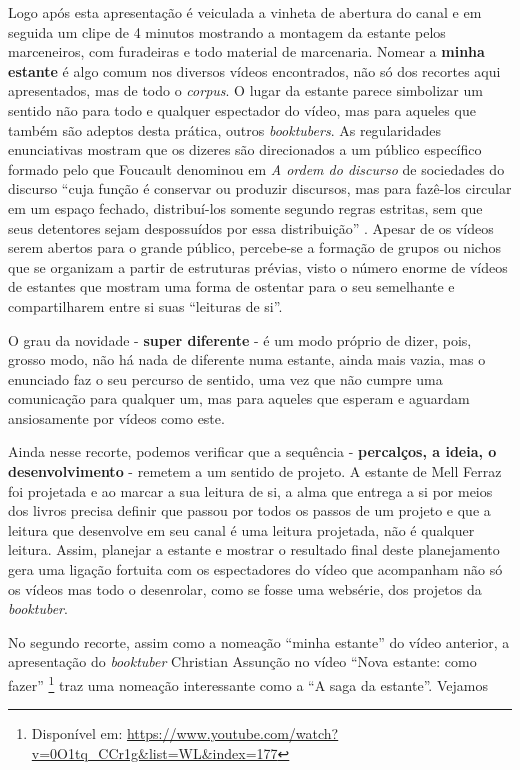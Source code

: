 Logo após esta apresentação é veiculada a vinheta de abertura do canal e
em seguida um clipe de 4 minutos mostrando a montagem da estante pelos
marceneiros, com furadeiras e todo material de marcenaria. Nomear a
\textbf{minha estante} é algo comum nos diversos vídeos
encontrados, não só dos recortes aqui apresentados, mas de todo o
\textit{corpus}. O lugar da estante parece simbolizar um sentido não para
todo e qualquer espectador do vídeo, mas para aqueles que também são
adeptos desta prática, outros \textit{booktubers}. As regularidades
enunciativas mostram que os dizeres são direcionados a um público
específico formado pelo que Foucault denominou em \textit{A ordem do
discurso} de sociedades do discurso \enquote{cuja função é conservar ou
produzir discursos, mas para fazê-los circular em um espaço fechado,
distribuí-los somente segundo regras estritas, sem que seus detentores
sejam despossuídos por essa distribuição} \cite[p]{foucault2010ordem}.
Apesar de os vídeos serem abertos para o grande público, percebe-se a
formação de grupos ou nichos que se organizam a partir de estruturas
prévias, visto o número enorme de vídeos de estantes que mostram uma
forma de ostentar para o seu semelhante e compartilharem entre si suas
\enquote{leituras de si}.

O grau da novidade - \textbf{super diferente} - é um modo
próprio de dizer, pois, grosso modo, não há nada de diferente numa
estante, ainda mais vazia, mas o enunciado faz o seu percurso de
sentido, uma vez que não cumpre uma comunicação para qualquer um, mas
para aqueles que esperam e aguardam ansiosamente por vídeos como este.

Ainda nesse recorte, podemos verificar que a sequência -
\textbf{percalços, a ideia, o desenvolvimento} - remetem a um
sentido de projeto. A estante de Mell Ferraz foi projetada e ao marcar a
sua leitura de si, a alma que entrega a si por meios dos livros precisa
definir que passou por todos os passos de um projeto e que a leitura que
desenvolve em seu canal é uma leitura projetada, não é qualquer leitura.
Assim, planejar a estante e mostrar o resultado final deste planejamento
gera uma ligação fortuita com os espectadores do vídeo que acompanham
não só os vídeos mas todo o desenrolar, como se fosse uma websérie, dos
projetos da \textit{booktuber}.

No segundo recorte, assim como a nomeação \enquote{minha estante} do vídeo
anterior, a apresentação do \textit{booktuber} Christian Assunção no vídeo
\enquote{Nova estante: como fazer} \footnote{Disponível em:
  \url{https://www.youtube.com/watch?v=0O1tq\_CCr1g\&list=WL\&index=177}} traz
uma nomeação interessante como a \enquote{A saga da estante}. Vejamos

